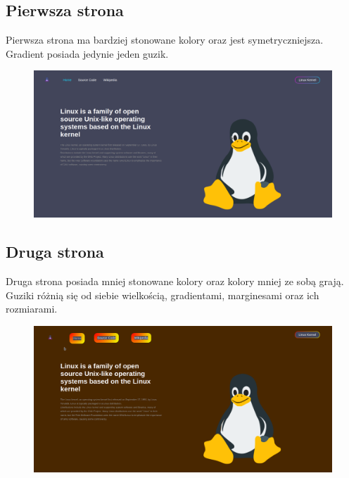 \documentclass{article}
\begin{document}
\subsection{Pierwsza strona}
Pierwsza strona ma bardziej stonowane kolory oraz jest symetryczniejsza. Gradient posiada jedynie jeden guzik.
\begin{figure}[h!]
    \includegraphics[scale=0.25]{str_dark.png}
    \centering
\end{figure}


\subsection{Druga strona}
Druga strona posiada mniej stonowane kolory oraz kolory mniej ze sobą grają. Guziki różnią się od siebie wielkością, gradientami, marginesami oraz ich rozmiarami.

\begin{figure}[h!]
    \includegraphics[scale=0.25]{str_pom.png}
    \centering
\end{figure}
\end{document}
